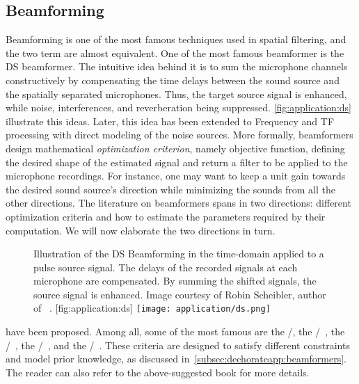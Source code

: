 \subsection{Beamforming}
Beamforming is one of the most famous techniques used in spatial filtering, and the two term are almost equivalent.
One of the most famous beamformer is the \ac{DS} beamformer.
The intuitive idea behind it is to sum the microphone channels constructively by compensating the time delays between the sound source and the spatially separated microphones.
Thus, the target source signal is enhanced, while noise, interferences, and reverberation being suppressed.
\cref{fig:application:ds} illustrate this ideas.
Later, this idea has been extended to Frequency and \ac{TF} processing with direct modeling of the noise sources.
More formally, beamformers design mathematical \textit{optimization criterion}, namely objective function, defining the desired shape of the estimated signal and return a filter to be applied to the microphone recordings.
For instance, one may want to keep a unit gain towards the desired sound source's direction while minimizing the sounds from all the other directions.
The literature on beamformers spans in two directions: different optimization criteria and how to estimate the parameters required by their computation.
We will now elaborate the two directions in turn.
\begin{figure}
    \begin{sidecaption}[]{
        Illustration of the \ac{DS} Beamforming in the time-domain applied to a pulse source signal.
        The delays of the recorded signals at each microphone are compensated.
        By summing the shifted signals, the source signal is enhanced.
        Image courtesy of Robin Scheibler, author of ~.
    }[fig:application:ds]
        \centering
        \texttt{[image: application/ds.png]}
    \end{sidecaption}
\end{figure}

 have been proposed.
Among all, some of the most famous are the \DStxt/, the \MVDRtxt/~, the \MaxSNRtxt/~, the \MaxSINRtxt/~, and the \LCMVtxt/~.
These criteria are designed to satisfy different constraints and model prior knowledge, as discussed in~\cref{subsec:dechorateapp:beamformers}.
The reader can also refer to the above-suggested book for more details.


